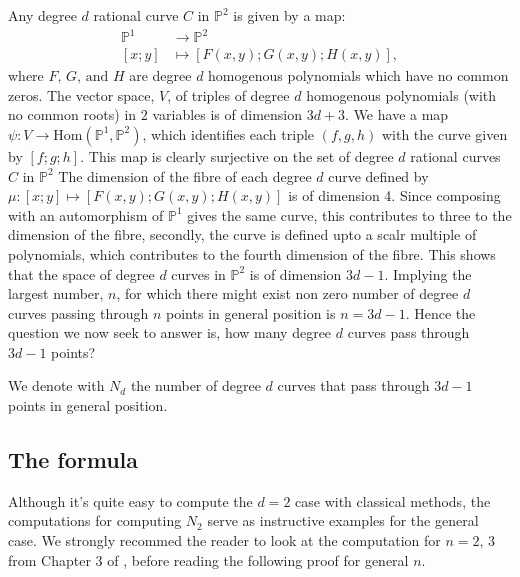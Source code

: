 \begin{remark}
    \label{why3d1points}
    Any degree $d$ rational curve $C$ in $\mathbb{P}^{2}$ is given by a map:
\begin{align*}
    \mathbb{P}^{1} &\to \mathbb{P}^{2}\\
    [x;y] &\mapsto [F(x,y);G(x,y);H(x,y)],
\end{align*}
where $F,\,G,\,\text{and }H$ are degree $d$ homogenous polynomials which have no common zeros.
The vector space, $V$, of triples of degree $d$ homogenous polynomials (with no common roots) in $2$ variables is of dimension $3d+3$.
We have a map $\psi: V \to \text{Hom}(\mathbb{P}^{1}, \mathbb{P}^{2})$, which identifies each triple $(f,g,h)$ with the curve given by $[f;g;h]$.
This map is clearly surjective on the set of degree $d$ rational curves $C$ in $\mathbb{P}^{2}$
The dimension of the fibre of each degree $d$ curve defined by $\mu : [x;y] \mapsto [F(x,y);G(x,y);H(x,y)]$ is of dimension 4.
Since composing with an automorphism of $\mathbb{P}^{1}$ gives the same curve, this contributes to three to the dimension of the fibre, secondly, the curve is defined upto a scalr multiple of polynomials, which contributes to the fourth dimension of the fibre.
This shows that the space of degree $d$ curves in $\mathbb{P}^{2}$ is of dimension $3d-1$.
Implying the largest number, $n$, for which there might exist non zero number of degree $d$ curves passing through $n$ points in general position is $n = 3d-1$.
Hence the question we now seek to answer is, how many degree $d$ curves pass through $3d-1$ points?
   
\end{remark}

\begin{definition}
    We denote with $N_{d}$ the number of degree $d$ curves that pass through $3d-1$ points in general position.
\end{definition}

\subsection{The formula}

Although it's quite easy to compute the $d = 2$ case with classical methods, the computations for computing $N_{2}$ serve as instructive examples for the general case.
We strongly recommed the reader to look at the computation for $n=2,\,3$ from Chapter $3$ of \cite{KockQcohom}, before reading the following proof for general $n$.

